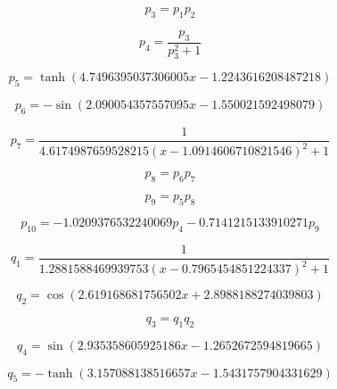 \begin{equation}
p_{3}=p_{1} p_{2}
\end{equation}


\begin{equation}
p_{4}=\frac{p_{3}}{p_{3}^{2} + 1}
\end{equation}


\begin{equation}
p_{5}=\tanh{\left(4.7496395037306005 x - 1.2243616208487218 \right)}
\end{equation}


\begin{equation}
p_{6}=- \sin{\left(2.090054357557095 x - 1.550021592498079 \right)}
\end{equation}


\begin{equation}
p_{7}=\frac{1}{4.6174987659528215 \left(x - 1.0914606710821546\right)^{2} + 1}
\end{equation}


\begin{equation}
p_{8}=p_{6} p_{7}
\end{equation}


\begin{equation}
p_{9}=p_{5} p_{8}
\end{equation}


\begin{equation}
p_{10}=- 1.0209376532240069 p_{4} - 0.7141215133910271 p_{9}
\end{equation}


\begin{equation}
q_{1}=\frac{1}{1.2881588469939753 \left(x - 0.7965454851224337\right)^{2} + 1}
\end{equation}


\begin{equation}
q_{2}=\cos{\left(2.619168681756502 x + 2.8988188274039803 \right)}
\end{equation}


\begin{equation}
q_{3}=q_{1} q_{2}
\end{equation}


\begin{equation}
q_{4}=\sin{\left(2.935358605925186 x - 1.2652672594819665 \right)}
\end{equation}


\begin{equation}
q_{5}=- \tanh{\left(3.157088138516657 x - 1.5431757904331629 \right)}
\end{equation}


